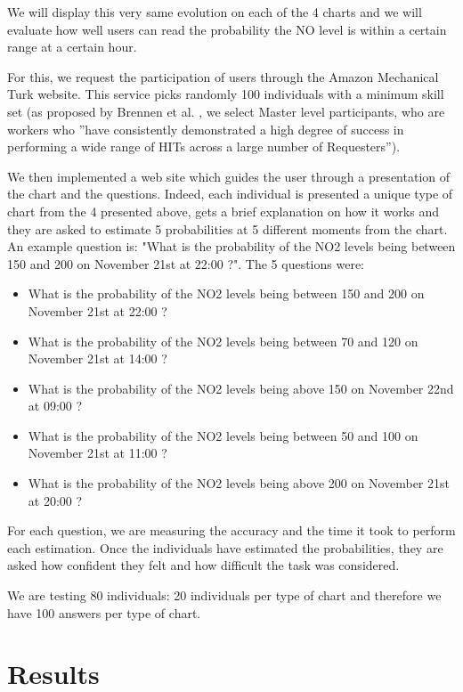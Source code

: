 \documentclass[a4paper,3p,sort&compress]{elsarticle}
\begin{document}
We will display this very same evolution on each of the 4 charts and we will evaluate how well users can 
read the probability the NO level is within a certain range at a certain hour. 

For this, we request the participation of users through the Amazon Mechanical Turk website. 
This service picks randomly 100 individuals with a minimum skill set (as proposed by Brennen 
et al. \cite{brennen_instrument_2018}, we select Master level participants, who are workers who 
''have consistently demonstrated a high degree of success in performing a wide range of HITs across a 
large number of Requesters'').

We then implemented a web site which guides the user through a presentation of the chart and the questions.
Indeed,  each individual is presented a unique type of chart from the 4 presented above, gets a brief 
explanation on how it works and they are asked to estimate 5 probabilities at 5 different moments from the chart. 
An example question is: 
"What is the probability of the NO2 levels being between 150 and 200 on 
November 21st at 22:00 ?". The 5 questions were:
\begin{itemize}
  \item What is the probability of the NO2 levels being between 150 and 200 on November 21st at 22:00 ?
  \item What is the probability of the NO2 levels being between 70 and 120 on November 21st at 14:00 ?
  \item What is the probability of the NO2 levels being above 150 on November 22nd at 09:00 ?
  \item What is the probability of the NO2 levels being between 50 and 100 on November 21st at 11:00 ?
  \item What is the probability of the NO2 levels being above 200 on November 21st at 20:00 ?
\end{itemize}

For each question, we are measuring the accuracy and the time it took to 
perform each estimation. Once the individuals have estimated the probabilities, they are asked how confident they 
felt and how difficult the task was considered.

We are testing 80 individuals: 20 individuals per type of chart and therefore we have 100 answers per 
type of chart.

\section{Results}
\label{sec:results}
\end{document}
